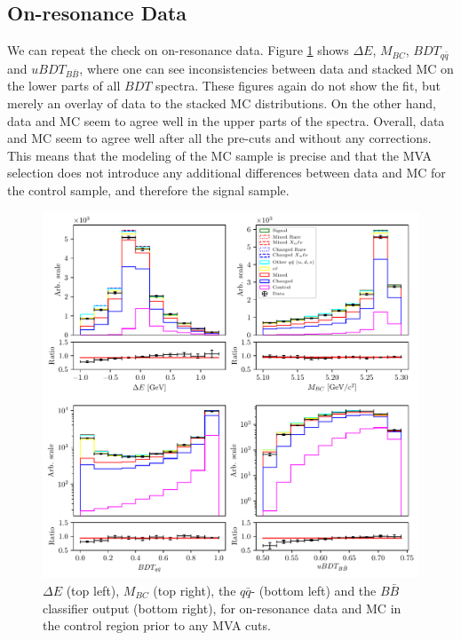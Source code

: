\subsection{On-resonance Data}

We can repeat the check on on-resonance data. Figure \ref{fig:onres_control} shows $\Delta E$, $M_{BC}$, $BDT_{q \bar q}$ and $uBDT_{B \bar B}$, where one can see inconsistencies between data and stacked MC on the lower parts of all $BDT$ spectra. These figures again do not show the fit, but merely an overlay of data to the stacked MC distributions. On the other hand, data and MC seem to agree well in the upper parts of the spectra. Overall, data and MC seem to agree well after all the pre-cuts and without any corrections. This means that the modeling of the MC sample is precise and that the MVA selection does not introduce any additional differences between data and MC for the control sample, and therefore the signal sample.
\begin{figure}[H]
	\centering
	\captionsetup{width=0.8\linewidth}
	\includegraphics[width=\linewidth]{fig/onres_control}
	\caption{$\Delta E$ (top left), $M_{BC}$ (top right), the $q \bar q$- (bottom left) and the $B \bar B$ classifier output (bottom right), for on-resonance data and MC in the control region prior to any MVA cuts.}
	\label{fig:onres_control}
\end{figure}
